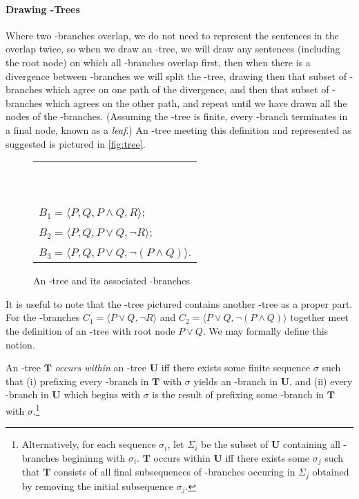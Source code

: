 \paragraph{Drawing \lone-Trees} Where two \lone-branches overlap, we do not need to represent the sentences in the overlap twice, so when we draw an \lone-tree, we will draw any sentences (including the root node) on which all \lone-branches overlap first, then when there is a divergence between \lone-branches we will split the \lone-tree, drawing then that subset of \lone-branches which agree on one path of the divergence, and then that subset of \lone-branches which agrees on the other path, and repeat until we have drawn all the nodes of the \lone-branches. (Assuming the \lone-tree is finite, every \lone-branch terminates in a final node, known as a \emph{leaf}.) An \lone-tree meeting this definition and represented as suggested is pictured in \autoref{fig:tree}. 
\begin{figure}[t]
\centering
\qobitree
\quad \begin{tabular}{l}
~ \\
~ \\
 $B_{1} = \langle P, Q, P\wedge Q, R\rangle$;\\
 $B_{2} = \langle P, Q, P\vee Q, ¬R\rangle$;\\
 $B_{3} = \langle P, Q, P\vee Q, ¬(P\wedge Q)\rangle$.
\end{tabular}


   \caption{An \lone-tree and its associated \lone-branches}
    \label{fig:tree}
\end{figure}


It is useful to note that the \lone-tree pictured contains another \lone-tree as a proper part. For the \lone-branches $C_{1} = \langle P\vee Q, ¬R\rangle$ and $C_{2} = \langle P\vee Q, ¬(P\wedge Q)\rangle$ together meet the definition of an \lone-tree with root node $P \vee Q$. We may formally define this notion. \begin{definition} \label{def:occurswithin}
An \lone-tree $\mathbf{T}$ \emph{occurs within} an \lone-tree $\mathbf{U}$ iff there exists some finite sequence $\sigma$ such that (i) prefixing every \lone-branch in $\mathbf{T}$ with $\sigma$ yields an \lone-branch in $\mathbf{U}$, and (ii) every \lone-branch in $\mathbf{U}$ which begins with $\sigma$ is the result of prefixing some \lone-branch in $\mathbf{T}$ with $\sigma$.\footnote{Alternatively, for each sequence $\sigma_{i}$, let $\Sigma_{i}$ be the subset of $\mathbf{U}$ containing all \lone-branches begininng with $\sigma_{i}$. $\mathbf{T}$ occurs within $\mathbf{U}$ iff there exists some $\sigma_{j}$ such that $\mathbf{T}$ consists of all final subsequences of \lone-branches occuring in $\Sigma_{j}$ obtained by removing the initial subsequence $\sigma_{j}$.}
\end{definition} 


